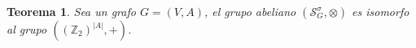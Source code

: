 \documentclass[11pt,a4paper,spanish]{report}
\theoremstyle{plain}
\newtheorem{teorema}{Teorema}[chapter]
\begin{document}
\begin{teorema}\label{abeliano}
Sea un grafo $G=(V,A)$, el grupo abeliano $(\mathcal{S}^\sigma_G,\otimes)$ es isomorfo al grupo
$((\mathbb{Z}_2)^{|A|},+)$. 

 
\end{teorema}

\end{document}
